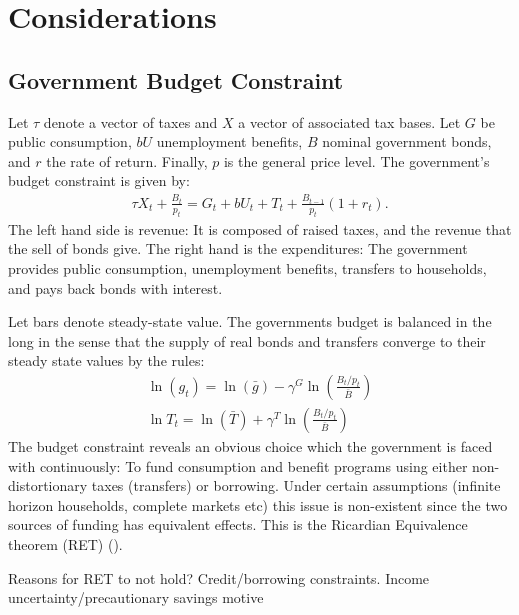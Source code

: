 


\section{Considerations}
\label{chap:Considerations}


\subsection{Government Budget Constraint}

Let $\tau$ denote a vector of taxes and $X$ a vector of associated tax bases. Let $G$ be public consumption, $b U$ unemployment benefits, $B$ nominal government bonds, and $r$ the rate of return. Finally, $p$ is the general price level.  The government's budget constraint is given by:
\begin{gather*}
\tau X_{t}+\frac{B_{t}}{p_{t}}=G_{t}+bU_{t}+T_{t}+\frac{B_{t-1}}{p_{t}}\left(1+r_{t}\right).    
\end{gather*}
The left hand side is revenue: It is composed of raised taxes, and the revenue that the sell of bonds give. The right hand is the expenditures: The government provides public consumption, unemployment benefits, transfers to households, and pays back bonds with interest. 

Let bars denote steady-state value. The governments budget is balanced in the long in the sense that the supply of real bonds and transfers converge to their steady state values by the rules: 
\begin{gather*}
\ln\left(g_{t}\right)=\ln\left(\bar{g}\right)-\gamma^{G}\ln\left(\frac{B_{t}/p_{t}}{\bar{B}}\right) \\
\ln T_{t}=\ln\left(\bar{T}\right)+\gamma^{T}\ln\left(\frac{B_{t}/p_{t}}{\bar{B}}\right)
\end{gather*}
The budget constraint reveals an obvious choice which the government is faced with continuously: To fund consumption and benefit programs using either non-distortionary taxes (transfers) or borrowing. 
Under certain assumptions (infinite horizon households, complete markets etc) this issue is non-existent since the two sources of funding has equivalent effects. This is the Ricardian Equivalence theorem (RET) (\citet{barro1974government}). 


\citet{elmendorf1999government}

Reasons for RET to not hold? 
Credit/borrowing constraints.
Income uncertainty/precautionary savings motive
